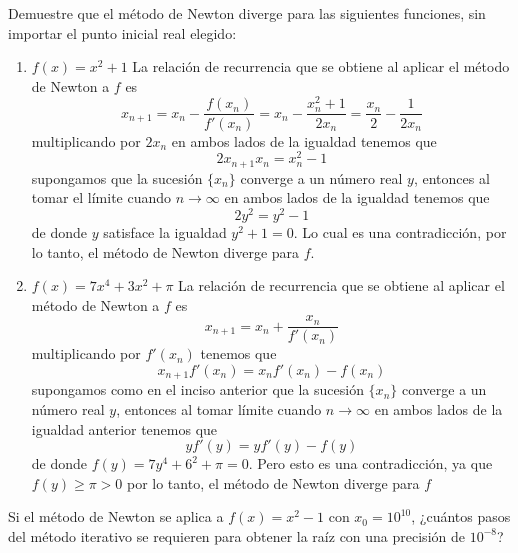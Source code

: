 \begin{problema}
Demuestre que el método de Newton diverge para las siguientes funciones, sin importar el punto inicial real elegido:
\begin{enumerate}[label=\alph*)]
\item \(f(x)=x^2+1\) 
La relación de recurrencia que se obtiene al aplicar el método de Newton a \(f\) es \[x_{n+1}=x_n-\frac{f(x_n)}{f'(x_n)}=x_n-\frac{x_n^2+1}{2x_n}=\frac{x_n}{2}-\frac{1}{2x_n}\] multiplicando por \(2x_n\) en ambos lados de la igualdad tenemos que \[2x_{n+1}x_n=x_n^2-1\]supongamos que la sucesión \(\{x_n\}\) converge a un número real \(y\), entonces al tomar el límite cuando \(n\to\infty\) en ambos lados de la igualdad tenemos que \[2y^2=y^2-1\]
de donde \(y\) satisface la igualdad \(y^2+1=0\). Lo cual es una contradicción, por lo tanto, el método de Newton diverge para \(f\).

\item \(f(x)=7x^4+3x^2+\pi\) 
La relación de recurrencia que se obtiene al aplicar el método de Newton a \(f\) es \[x_{n+1}=x_n+\frac{x_n}{f'(x_n)}\]
multiplicando por \(f'(x_n)\) tenemos que \[x_{n+1}f'(x_n)=x_nf'(x_n)-f(x_n)\]
supongamos como en el inciso anterior que la sucesión \(\{x_n\}\) converge a un número real \(y\), entonces al tomar límite cuando \(n\to\infty\) en ambos lados de la igualdad anterior tenemos que \[yf'(y)=yf'(y)-f(y)\] de donde \(f(y)=7y^4+6^2+\pi=0\). Pero esto es una contradicción, ya que \(f(y)\ge\pi>0\) por lo tanto, el método de Newton diverge para \(f\)
\end{enumerate}
\end{problema}

\vspace{1cm}
\begin{problema}
Si el método de Newton se aplica a \(f(x)=x^2-1\) con \(x_0=10^{10}\), ¿cuántos pasos del método iterativo se requieren para obtener la raíz con una precisión de \(10^{-8}\)?
\end{problema}


